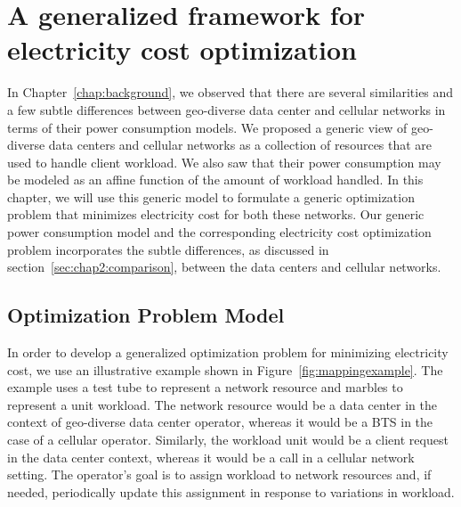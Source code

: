 \chapter{A generalized framework for electricity cost optimization}
\label{chap:framework} In Chapter~\ref{chap:background}, we observed that there are several similarities and a few subtle differences between geo-diverse data center and cellular networks in terms of their power consumption models. We proposed a generic view of geo-diverse data centers and cellular networks as a collection of resources that are used to handle client workload. We also saw that their power consumption may be modeled as an affine function of the amount of workload handled. In this chapter, we will use this generic model to formulate a generic optimization problem that minimizes electricity cost for both these networks. Our generic power consumption model and the corresponding electricity cost optimization problem incorporates the subtle differences, as discussed in section~\ref{sec:chap2:comparison}, between the data centers and cellular networks.


\section{Optimization Problem Model} %
In order to develop a generalized optimization problem for minimizing electricity cost, we use an illustrative example shown in Figure~\ref{fig:mappingexample}. The example uses a test tube to represent a network resource and marbles to represent a unit workload. The network resource would be a data center in the context of geo-diverse data center operator, whereas it would be a BTS in the case of a cellular operator. Similarly, the workload unit would be a client request in the data center context, whereas it would be a call in a cellular network setting. The operator's goal is to assign workload to network resources and, if needed, periodically update this assignment in response to variations in workload.

